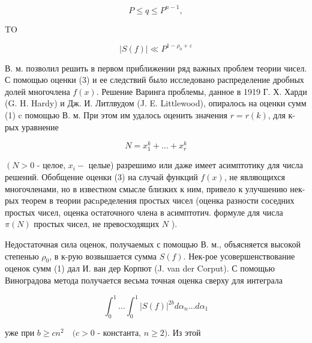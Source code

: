 \documentclass[10pt]{article}
\begin{document}
\[

P \leqslant q \leqslant P^{n-1},

\]



TO



\[

|S(f)| \ll P^{1-\rho_{0}+\varepsilon}

\]



В. м. позволил решить в первом приближении ряд важных проблем теории чисел. С помощью оценки (3) и ее следствий было исследовано распределение дробных долей многочлена $f(x)$. Решение Варинга проблемы, данное в 1919 Г. Х. Харди (G. H. Hardy) и Дж. И. Литлвудом (J. E. Littlewood), опиралось на оценки сумм (1) c помощью В. м. При этом им удалось оценить значения $r=r(k)$, для к-рых уравнение



\[

N=x_{1}^{k}+\ldots+x_{r}^{k}

\]



$\left(N>0\right.$ - целое, $x_{i}-$ целые) разрешимо или даже имеет асимптотику для числа решений. Обобщение оценки (3) на случай функций $f(x)$, не являющихся многочленами, но в известном смысле близких к ним, привело к улучшению нек-рых теорем в теории расnределения простых чисел (оценка разности соседних простых чисел, оценка остаточного члена в асимптотич. формуле для числа $\pi(N)$ простых чисел, не превосходящих $N$ ).



Недостаточная сила оценок, получаемых с помощью В. м., объясняется высокой степенью $\rho_{0}$, в к-рую возвышается сумма $S(f)$. Нек-рое усовершенствование оценок сумм (1) дал И. ван дер Корпют (J. van der Corput). С помощью Виноградова метода получается весьма точная оценка сверху для интеграла



\[

\int_{0}^{1} \ldots \int_{0}^{1}|S(f)|^{2 b} d \alpha_{n} \ldots d \alpha_{1}

\]



уже при $b \geqslant c n^{2} \quad(c>0$ - константа, $n \geqslant 2)$. Из этой
\end{document}
